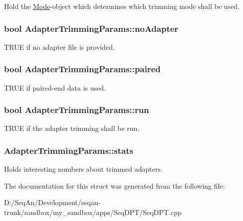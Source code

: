 Hold the \hyperlink{struct_mode}{Mode}-\/object which determines which trimming mode shall be used. \hypertarget{struct_adapter_trimming_params_a8386f1819859d97bb58011903f5dd847}{
\subsubsection[{no\-Adapter}]{\setlength{\rightskip}{0pt plus 5cm}bool Adapter\-Trimming\-Params\-::no\-Adapter}}\label{struct_adapter_trimming_params_a8386f1819859d97bb58011903f5dd847}
T\-R\-U\-E if no adapter file is provided. \hypertarget{struct_adapter_trimming_params_a9c442bd3226e26f0becce6eba5f40359}{
\subsubsection[{paired}]{\setlength{\rightskip}{0pt plus 5cm}bool Adapter\-Trimming\-Params\-::paired}}\label{struct_adapter_trimming_params_a9c442bd3226e26f0becce6eba5f40359}
T\-R\-U\-E if paired-\/end data is used. \hypertarget{struct_adapter_trimming_params_a61f37e8fe2d242947cfd358b85a0380e}{
\subsubsection[{run}]{\setlength{\rightskip}{0pt plus 5cm}bool Adapter\-Trimming\-Params\-::run}}\label{struct_adapter_trimming_params_a61f37e8fe2d242947cfd358b85a0380e}
T\-R\-U\-E if the adapter trimming shall be run. \hypertarget{struct_adapter_trimming_params_a557d501f056a0ba2ae35560ed8d72a9d}{
\subsubsection[{stats}]{ Adapter\-Trimming\-Params\-::stats}}\label{struct_adapter_trimming_params_a557d501f056a0ba2ae35560ed8d72a9d}
Holds interesting numbers about trimmed adapters. 

The documentation for this struct was generated from the following file\-:\begin{DoxyCompactItemize}
\item 
D\-:/\-Seq\-An/\-Development/seqan-\/trunk/sandbox/my\-\_\-sandbox/apps/\-Seq\-D\-P\-T/Seq\-D\-P\-T.\-cpp\end{DoxyCompactItemize}
